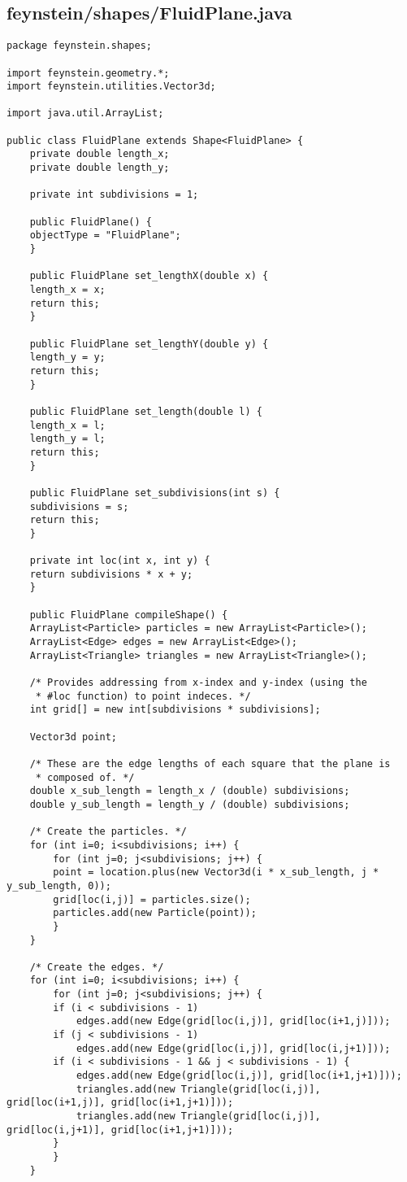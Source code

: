 \subsection*{feynstein/shapes/FluidPlane.java}
\begin{lstlisting}
package feynstein.shapes;

import feynstein.geometry.*;
import feynstein.utilities.Vector3d;

import java.util.ArrayList;

public class FluidPlane extends Shape<FluidPlane> {
    private double length_x;
    private double length_y;

    private int subdivisions = 1;

    public FluidPlane() {
	objectType = "FluidPlane";
    }

    public FluidPlane set_lengthX(double x) {
	length_x = x;
	return this;
    }

    public FluidPlane set_lengthY(double y) {
	length_y = y;
	return this;
    }

    public FluidPlane set_length(double l) {
	length_x = l;
	length_y = l;
	return this;
    }

    public FluidPlane set_subdivisions(int s) {
	subdivisions = s;
	return this;
    }

    private int loc(int x, int y) {
	return subdivisions * x + y;
    }

    public FluidPlane compileShape() {
	ArrayList<Particle> particles = new ArrayList<Particle>();
	ArrayList<Edge> edges = new ArrayList<Edge>();
	ArrayList<Triangle> triangles = new ArrayList<Triangle>();

	/* Provides addressing from x-index and y-index (using the
	 * #loc function) to point indeces. */
	int grid[] = new int[subdivisions * subdivisions];

	Vector3d point;

	/* These are the edge lengths of each square that the plane is
	 * composed of. */
	double x_sub_length = length_x / (double) subdivisions;
	double y_sub_length = length_y / (double) subdivisions;

	/* Create the particles. */
	for (int i=0; i<subdivisions; i++) {
	    for (int j=0; j<subdivisions; j++) {
		point = location.plus(new Vector3d(i * x_sub_length, j * y_sub_length, 0));
		grid[loc(i,j)] = particles.size();
		particles.add(new Particle(point));
	    }
	}

	/* Create the edges. */
	for (int i=0; i<subdivisions; i++) {
	    for (int j=0; j<subdivisions; j++) {
		if (i < subdivisions - 1)
		    edges.add(new Edge(grid[loc(i,j)], grid[loc(i+1,j)]));
		if (j < subdivisions - 1)
		    edges.add(new Edge(grid[loc(i,j)], grid[loc(i,j+1)]));
		if (i < subdivisions - 1 && j < subdivisions - 1) {
		    edges.add(new Edge(grid[loc(i,j)], grid[loc(i+1,j+1)]));
		    triangles.add(new Triangle(grid[loc(i,j)], grid[loc(i+1,j)], grid[loc(i+1,j+1)]));
		    triangles.add(new Triangle(grid[loc(i,j)], grid[loc(i,j+1)], grid[loc(i+1,j+1)]));
		}
	    }
	}


\end{lstlisting}
